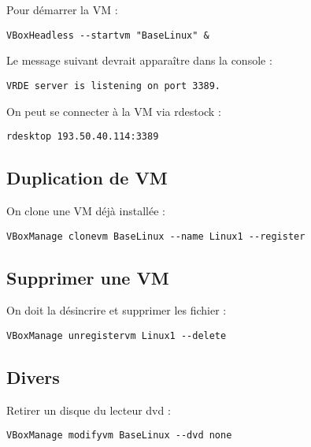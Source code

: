 Pour démarrer la VM :

\begin{verbatim}
VBoxHeadless --startvm "BaseLinux" &
\end{verbatim}

Le message suivant devrait apparaître dans la console :

\begin{verbatim}
VRDE server is listening on port 3389.
\end{verbatim}

On peut se connecter à la VM via rdestock :

\begin{verbatim}
rdesktop 193.50.40.114:3389
\end{verbatim}

\subsection{Duplication de VM}

On clone une VM déjà installée :

\begin{verbatim}
VBoxManage clonevm BaseLinux --name Linux1 --register
\end{verbatim}

\subsection{Supprimer une VM}

On doit la désincrire et supprimer les fichier :

\begin{verbatim}
VBoxManage unregistervm Linux1 --delete
\end{verbatim}

\subsection{Divers}

Retirer un disque du lecteur dvd :

\begin{verbatim}
VBoxManage modifyvm BaseLinux --dvd none
\end{verbatim}
